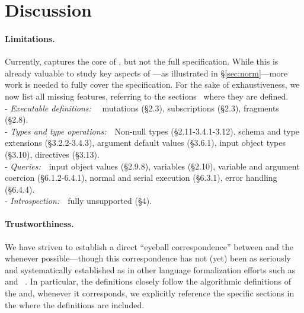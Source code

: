 \section{Discussion}\label{sec:discussion}

\paragraph{Limitations.}

Currently, \gcoql captures the core of \gql, but not the full specification. While this is already valuable to study key aspects of \gql---as illustrated in \S\ref{sec:norm}---more work is needed to fully cover the specification. 
For the sake of exhaustiveness, we now list all missing features, referring to the \spec sections~\cite{gqlspec} where they are defined.\\
- \emph{Executable definitions:}\ \ %
mutations (\S2.3), subscriptions (\S2.3), fragments (\S2.8).\\
- \emph{Types and type operations:}\ \ Non-null types (\S2.11-3.4.1-3.12), schema and type extensions (\S3.2.2-3.4.3), argument default values (\S3.6.1), input object types (\S3.10), directives (\S3.13).\\
- \emph{Queries:}\ \ input object values (\S2.9.8), variables (\S2.10), variable and argument coercion (\S6.1.2-6.4.1), normal and serial execution (\S6.3.1), error handling (\S6.4.4).\\
- \emph{Introspection:}\ \ fully unsupported (\S4). 



\paragraph{Trustworthiness.}

We have striven to establish a direct ``eyeball correspondence'' between \gcoql and the \spec whenever possible---though this correspondence has not (yet) been as seriously and systematically established as in other language formalization efforts such as \jscert~\cite{jscert} and \coqr~\cite{coqr}. 
In particular, the \gcoql definitions closely follow the algorithmic definitions of the \spec and, whenever it corresponds, we explicitly reference the specific sections in the \spec where the definitions are included. 

